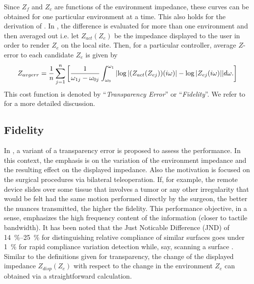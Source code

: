 Since $Z_f$ and $Z_c$ are functions of the environment impedance, these curves can be obtained for one particular environment
at a time. This also holds for the derivation of \cite{lawrence}. In \cite{goranthesis}, the difference  is evaluated for more 
than one environment and then averaged out i.e. let $Z_{act}(Z_e)$ be the impedance displayed to the user in order to render 
$Z_e$ on the local site. Then, for a particular controller, average $Z$-error to each candidate $Z_e$ is given by
\begin{equation}
Z_{avgerr} = \frac{1}{n}\sum_{j=1}^n{\left[
    \frac{1}{\omega_{1j}-\omega_{0j}}\int_{\omega_0}^{\omega_1}{%
                                     \abs{\log|(Z_{act}(Z_{ej}))(\iw)|-\log |Z_{ej}(\iw)|}}d\omega.
                                     \right]}
\label{eq:zdiff}
\end{equation}
This cost function is denoted by \enquote{\emph{Transparency Error}} or \enquote{\emph{Fidelity}}. We refer to \cite{weir} 
for a more detailed discussion. 


\subsection{Fidelity}\label{sec:perf:fidelity}
In \cite{cavusoglu}, a variant of a transparency error is proposed to assess the performance. In this context, 
the emphasis is on the variation of the environment impedance and the resulting effect on the displayed impedance. 
Also the motivation is focused on the surgical procedures via bilateral teleoperation. If, for 
example, the remote device slides over some tissue that involves a tumor or any other irregularity that would be felt
had the same motion performed directly by the surgeon, the better the nuances transmitted, the higher
the fidelity. This performance objective, in a sense, emphasizes the high frequency content of the information (closer
to tactile bandwidth). It has been noted that the Just Noticable Difference (JND) of \SIrange{14}{25}{\percent} for 
distinguishing relative compliance of similar surfaces goes under \SI{1}{\percent} for rapid compliance variation detection 
while, say, scanning a surface \cite{dhruvtendick}. Similar to the definitions given for transparency, the change of the 
displayed impedance $Z_{disp}(Z_e)$ with respect to the change in the environment $Z_e$ can obtained via a straightforward 
calculation. 

